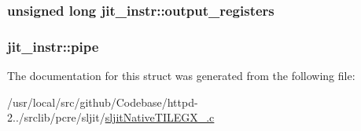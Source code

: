 \subsubsection[{\texorpdfstring{output\+\_\+registers}{output_registers}}]{\setlength{\rightskip}{0pt plus 5cm}unsigned long jit\+\_\+instr\+::output\+\_\+registers}\hypertarget{structjit__instr_a8d5c34fdb22d8fdaf59e003d4563f608}{}\label{structjit__instr_a8d5c34fdb22d8fdaf59e003d4563f608}
\subsubsection[{\texorpdfstring{pipe}{pipe}}]{ jit\+\_\+instr\+::pipe}\hypertarget{structjit__instr_abce8df2506dffa494a26ea07249ca1c9}{}\label{structjit__instr_abce8df2506dffa494a26ea07249ca1c9}


The documentation for this struct was generated from the following file\+:\begin{DoxyCompactItemize}
\item 
/usr/local/src/github/\+Codebase/httpd-\/2../srclib/pcre/sljit/\hyperlink{sljitNativeTILEGX__64_8c}{sljit\+Native\+T\+I\+L\+E\+G\+X\+\_.\+c}\end{DoxyCompactItemize}
